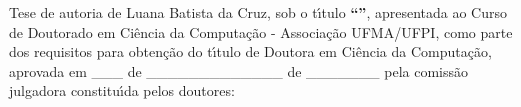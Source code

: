 \documentclass[
	12pt,				%
	openright,			%
	oneside,			%
	a4paper,			%
	chapter=TITLE,		%
	english,			%
	french,				%
	spanish,			%
	brazil				%
	]{abntex2}
\renewcommand{\ABNTEXchapterfont}{\bfseries \rmfamily}
\begin{document}
%
%
%
\begin{folhadeaprovacao}


    

        


\noindent Tese de autoria de Luana Batista da Cruz, sob o t{\'\i}tulo \textbf{``\imprimirtitulo''}, apresentada ao Curso de Doutorado em Ciência da Computação - Associação UFMA/UFPI, como parte dos requisitos para obtenção do t{\'\i}tulo de Doutora em Ciência da Computação, aprovada em \_\_\_ de \_\_\_\_\_\_\_\_\_\_\_\_\_ de \_\_\_\_\_\_\_ pela comissão julgadora constitu{\'\i}da pelos doutores:   

\vspace*{0.4cm}


\end{folhadeaprovacao}
\end{document}
